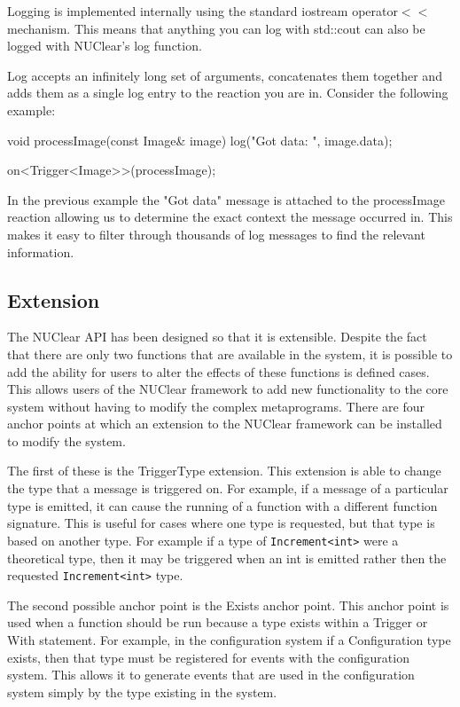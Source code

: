 \documentclass[english,12pt]{scrartcl}
\begin{document}
				Logging is implemented internally using the standard iostream operator$<<$ mechanism.
				This means that anything you can log with std::cout can also be logged with NUClear's log function.

				Log accepts an infinitely long set of arguments, concatenates them together and adds them as a single log entry to the reaction you are in.
				Consider the following example:

				\begin{cppcode}
					void processImage(const Image& image) {
					    log("Got data: ", image.data);
					}

					on<Trigger<Image>>(processImage);
				\end{cppcode}

				In the previous example the "Got data" message is attached to the processImage reaction allowing us to determine the exact context the message occurred in.
				This makes it easy to filter through thousands of log messages to find the relevant information.

		\subsection{Extension}
			The NUClear API has been designed so that it is extensible.
			Despite the fact that there are only two functions that are available in the system, it is possible to add the ability for users to alter the effects of these functions is defined cases.
			This allows users of the NUClear framework to add new functionality to the core system without having to modify the complex metaprograms.
			There are four anchor points at which an extension to the NUClear framework can be installed to modify the system.

			The first of these is the TriggerType extension.
			This extension is able to change the type that a message is triggered on.
			For example, if a message of a particular type is emitted, it can cause the running of a function with a different function signature.
			This is useful for cases where one type is requested, but that type is based on another type.
			For example if a type of \texttt{Increment<int>} were a theoretical type, then it may be triggered when an int is emitted rather then the requested \texttt{Increment<int>} type.

			The second possible anchor point is the Exists anchor point.
			This anchor point is used when a function should be run because a type exists within a Trigger or With statement.
			For example, in the configuration system if a Configuration type exists, then that type must be registered for events with the configuration system.
			This allows it to generate events that are used in the configuration system simply by the type existing in the system.
\end{document}
